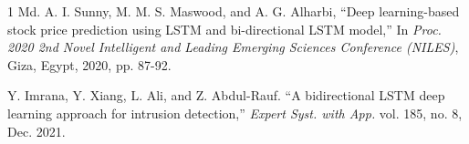 \documentclass[lettersize,journal]{IEEEtran}
\begin{document}
\begin{thebibliography}{1}
Md. A. I. Sunny, M. M. S. Maswood, and A. G. Alharbi, ``Deep learning-based stock price prediction using LSTM and bi-directional LSTM model,'' In \textit{Proc. 2020 2nd Novel Intelligent and Leading Emerging Sciences Conference (NILES)}, Giza, Egypt, 2020, pp. 87-92.

Y. Imrana, Y. Xiang, L. Ali, and Z. Abdul-Rauf. ``A bidirectional LSTM deep learning approach for intrusion detection,'' \textit{Expert Syst. with App.} vol. 185, no. 8, Dec. 2021.

\end{thebibliography}

\vfill
\end{document}
